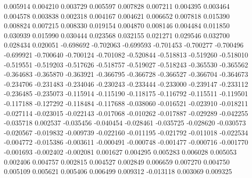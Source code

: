 0.005914
0.004210
0.003729
0.005597
0.007828
0.007211
0.004395
0.003464
0.004578
0.003838
0.002318
0.004167
0.004621
0.006652
0.007818
0.015390
0.008824
0.007215
0.008330
0.019154
0.004870
0.008146
0.004484
0.011850
0.030939
0.015990
0.030444
0.023568
0.032155
0.021271
0.029546
0.032700
0.028434
0.020051
-0.698692
-0.702063
-0.699593
-0.701453
-0.700277
-0.700496
-0.699921
-0.700640
-0.700124
-0.701082
-0.520844
-0.518813
-0.519260
-0.518010
-0.519551
-0.519203
-0.517626
-0.518757
-0.519027
-0.518243
-0.365530
-0.365562
-0.364683
-0.365870
-0.363921
-0.366795
-0.366728
-0.366527
-0.366704
-0.364673
-0.234706
-0.231483
-0.234046
-0.230243
-0.233444
-0.233000
-0.239147
-0.233112
-0.236485
-0.235073
-0.115914
-0.115190
-0.118175
-0.116792
-0.115511
-0.119501
-0.117188
-0.127292
-0.118484
-0.117688
-0.038060
-0.016521
-0.023910
-0.018211
-0.027114
-0.023015
-0.022143
-0.017068
-0.010262
-0.017887
-0.029289
-0.042255
-0.035718
0.002537
-0.035456
-0.040454
-0.028461
-0.035725
-0.028620
-0.030573
-0.020567
-0.019832
-0.009739
-0.022160
-0.011195
-0.021792
-0.011018
-0.022534
-0.004772
-0.015386
-0.003611
-0.000491
-0.000748
-0.001477
-0.000716
-0.001770
-0.001693
-0.002402
-0.002081
0.001627
0.004295
0.005283
0.006028
0.005053
0.002406
0.004757
0.002815
0.004527
0.002849
0.006659
0.007270
0.004750
0.005109
0.005621
0.005406
0.006499
0.009312
-0.013118
0.003069
0.009325
